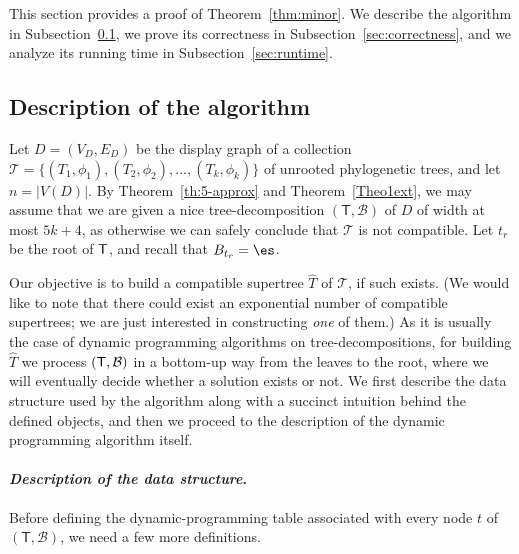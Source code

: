 

This section provides a proof of Theorem~\ref{thm:minor}. We describe the algorithm in Subsection~\ref{sec:description}, we prove its correctness in Subsection~\ref{sec:correctness}, and we analyze its running time in Subsection~\ref{sec:runtime}.


\subsection{Description of the algorithm} 
\label{sec:description}

Let   $D=(V_D,E_D)$ be the display graph of a collection $\mathcal{T}=\{(T_1, \phi_1), (T_2, \phi_2), \ldots, (T_k, \phi_k)\}$ of unrooted phylogenetic trees, and let $n = |V(D)|$. By Theorem~\ref{th:5-approx} and Theorem~\ref{Theo1ext}, we may assume that we are given a
nice tree-decomposition $(\mathsf{T},\mathcal{B})$ of $D$ of width at most $5k+4$, as otherwise we can safely conclude that $\mathcal{T}$ is not compatible. Let  $t_r$ be the root of ${\sf T}$, and recall that $B_{t_r} = \es$.

Our objective is to build a compatible supertree $\widehat{T}$ of $\mathcal{T}$, if such exists. (We would like to note that there could exist an exponential number of compatible supertrees; we are just interested in constructing {\sl one} of them.) As it is usually the case of dynamic programming algorithms on tree-decompositions, for building $\widehat{T}$ we process $({\sf T},\mathcal{B})$ in a bottom-up way from the leaves to the root, where we will eventually decide whether a solution exists or not. We first describe the data structure used by the algorithm along with a succinct intuition behind the defined objects, and then we proceed to the description of the dynamic programming algorithm itself.






\paragraph{\textbf{\emph{Description of the data structure}}.} Before defining the dynamic-programming table associated with every node $t$ of $(\mathsf{T},\mathcal{B})$, we need a few more definitions.


